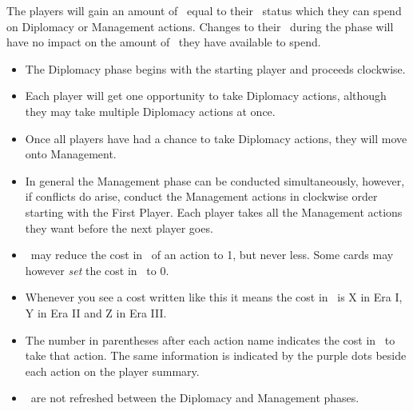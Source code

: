 \documentclass[10pt,twocolumn]{article}
\begin{document}

The players will gain an amount of \polfs\ equal to their \pol\ status which they can spend on Diplomacy or Management actions. Changes to their \pol\ during the phase will have no impact on the amount of \polfs\ they have available to spend.
\begin{itemize}
\item The Diplomacy phase begins with the starting player and proceeds clockwise.
\item Each player will get one opportunity to take Diplomacy actions, although they may take multiple Diplomacy actions at once.
\item Once all players have had a chance to take Diplomacy actions, they will move onto Management.
\item In general the Management phase can be conducted simultaneously, however, if conflicts do arise, conduct the Management actions in clockwise order starting with the First Player. Each player takes all the Management actions they want before the next player goes.
\item \landcards\ may reduce the cost in \polfs\ of an action to 1, but never less. Some cards may however \textit{set} the cost in \polfs\ to 0.
\item Whenever you see a cost written like this  it means the cost in \goods\ is X in Era I, Y in Era II and Z in Era III.
\item The number in parentheses after each action name indicates the cost in \polfs\ to take that action. The same information is indicated by the purple dots beside each action on the player summary.
\item \polfs\ are not refreshed between the Diplomacy and Management phases.
\end{itemize}
\end{document}
